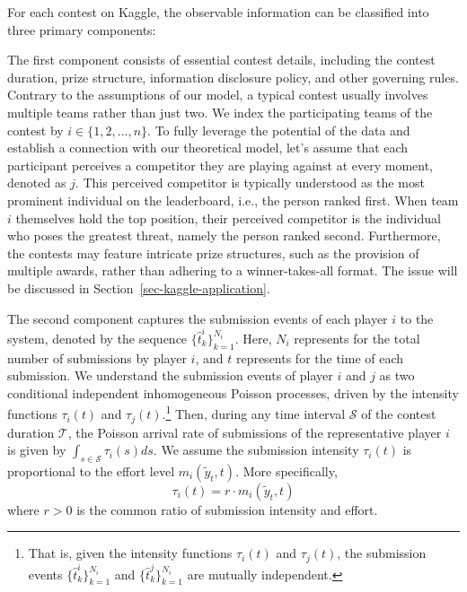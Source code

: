 \documentclass[mnsc]{informs3}
\begin{document}
For each contest on Kaggle, the observable information can be classified into three primary components: 

The first component consists of essential contest details, including the contest duration, prize structure, information disclosure policy, and other governing rules.
Contrary to the assumptions of our model, a typical contest usually involves multiple teams rather than just two.
We index the participating teams of the contest by $i\in\{1, 2, ..., n\}$. 
To fully leverage the potential of the data and establish a connection with our theoretical model, let's assume that each participant perceives a competitor they are playing against at every moment, denoted as $j$. 
This perceived competitor is typically understood as the most prominent individual on the leaderboard, i.e., the person ranked first.
When team $i$ themselves hold the top position, their perceived competitor is the individual who poses the greatest threat, namely the person ranked second.
Furthermore, the contests may feature intricate prize structures, such as the provision of multiple awards, rather than adhering to a winner-takes-all format.
The issue will be discussed in Section~\ref{sec-kaggle-application}. 

The second component captures the submission events of each player $i$ to the system, denoted by the sequence $\{\hat{t}^i_k\}_{k=1}^{N_i}$.
Here, $N_i$ represents for the total number of submissions by player $i$, and $t$ represents for the time of each submission. 
We understand the submission events of player $i$ and $j$ as two conditional independent inhomogeneous Poisson processes, driven by the intensity functions $\tau_i(t)$ and $\tau_j(t)$.\footnote{That is, given the intensity functions $\tau_i(t)$ and $\tau_j(t)$, the submission events $\{\hat{t}^i_k\}_{k=1}^{N_i}$ and $\{\hat{t}^j_k\}_{k=1}^{N_i}$ are mutually independent.}
Then, during any time interval $\mathcal{S}$ of the contest duration $\mathcal{T}$, the Poisson arrival rate of submissions of the representative player $i$ is given by $\int_{s\in\mathcal{S}}\tau_i(s)ds$. 
We assume the submission intensity $\tau_i(t)$ is proportional to the effort level $m_i(\tilde{y}_t, t)$. More specifically, 
\begin{equation}\label{eq-model-intensity}
\tau_i(t) = r \cdot m_i(\tilde{y}_t, t)
\end{equation}
where $r>0$ is the common ratio of submission intensity and effort. 
\end{document}
